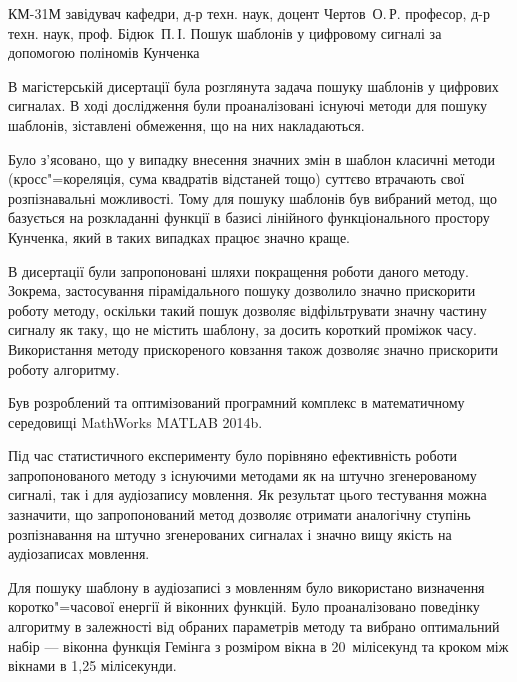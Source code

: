 \documentclass[pdftex]{thesis_utf8}
\begin{document}
    {КМ-31М}
    {завідувач кафедри, д-р техн. наук, доцент Чертов~О.\,Р.}
    {професор, д-р техн. наук, проф. Бідюк~П.\,І.}
    {Пошук шаблонів у цифровому сигналі за допомогою поліномів Кунченка}



\pagestyle{plain}

\tableofcontents









\conclusion{}
В магістерській дисертації була розглянута задача пошуку шаблонів у цифрових сигналах.
В ході дослідження були проаналізовані існуючі методи для пошуку шаблонів, зіставлені обмеження, що на них
накладаються.

Було з’ясовано, що у випадку внесення значних змін в шаблон класичні методи (кросс"=кореляція, сума квадратів
відстаней тощо) суттєво втрачають свої розпізнавальні можливості.
Тому для пошуку шаблонів був вибраний метод, що базується на розкладанні функції в базисі лінійного функціонального
простору Кунченка, який в таких випадках працює значно краще.

В дисертації були запропоновані шляхи покращення роботи даного методу.
Зокрема, застосування пірамідального пошуку дозволило значно прискорити роботу методу, оскільки такий пошук дозволяє
відфільтрувати значну частину сигналу як таку, що не містить шаблону, за досить короткий проміжок часу.
Використання методу прискореного ковзання також дозволяє значно прискорити роботу алгоритму.

Був розроблений та оптимізований програмний комплекс в математичному середовищі MathWorks MATLAB 2014b.

Під час статистичного експерименту було порівняно ефективність роботи запропонованого методу з існуючими методами як
на штучно згенерованому сигналі, так і для аудіозапису мовлення.
Як результат цього тестування можна зазначити, що запропонований метод дозволяє отримати аналогічну ступінь
розпізнавання на штучно згенерованих сигналах і значно вищу якість на аудіозаписах мовлення.

Для пошуку шаблону в аудіозаписі з мовленням було використано визначення коротко"=часової енергії й віконних функцій.
Було проаналізовано поведінку алгоритму в залежності від обраних параметрів методу та вибрано оптимальний набір ---
віконна функція Гемінга з розміром вікна в 20~мілісекунд та кроком між вікнами в 1,25 мілісекунди.
\end{document}
